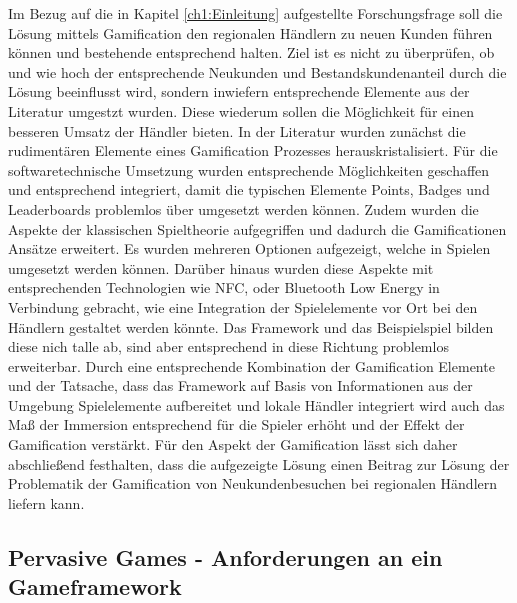 Im Bezug auf die in Kapitel \ref{ch1:Einleitung} aufgestellte Forschungsfrage soll die Lösung mittels Gamification den regionalen Händlern zu neuen Kunden führen können und bestehende entsprechend halten. Ziel ist es nicht zu überprüfen, ob und wie hoch der entsprechende Neukunden und Bestandskundenanteil durch die Lösung beeinflusst wird, sondern inwiefern entsprechende Elemente aus der Literatur umgestzt wurden. Diese wiederum sollen die Möglichkeit für einen besseren Umsatz der Händler bieten.
In der Literatur wurden zunächst die rudimentären Elemente eines Gamification Prozesses herauskristalisiert. Für die softwaretechnische Umsetzung wurden entsprechende Möglichkeiten geschaffen und entsprechend integriert, damit die typischen Elemente Points, Badges und Leaderboards problemlos über umgesetzt werden können. Zudem wurden die Aspekte der klassischen Spieltheorie aufgegriffen und dadurch die Gamificationen Ansätze erweitert. Es wurden mehreren Optionen aufgezeigt, welche in Spielen umgesetzt werden können. Darüber hinaus wurden diese Aspekte mit entsprechenden Technologien wie NFC, oder Bluetooth Low Energy in Verbindung gebracht, wie eine Integration der Spielelemente vor Ort bei den Händlern gestaltet werden könnte. Das Framework und das Beispielspiel bilden diese nich talle ab, sind aber entsprechend in diese Richtung problemlos erweiterbar.
Durch eine entsprechende Kombination der Gamification Elemente und der Tatsache, dass das Framework auf Basis von Informationen aus der Umgebung Spielelemente aufbereitet und lokale Händler integriert wird auch das Maß der Immersion entsprechend für die Spieler erhöht und der Effekt der Gamification verstärkt.
Für den Aspekt der Gamification lässt sich daher abschließend festhalten, dass die aufgezeigte Lösung einen Beitrag zur Lösung der Problematik der Gamification von Neukundenbesuchen bei regionalen Händlern liefern kann.

\subsection*{Pervasive Games  - Anforderungen an ein Gameframework}

